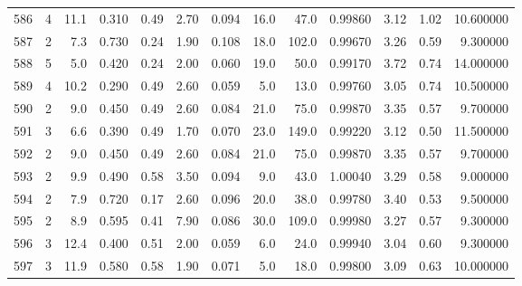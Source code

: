 \begin{tabular}{lrrrrrrrrrrrr}
586  &        4 &           11.1 &             0.310 &         0.49 &            2.70 &      0.094 &                 16.0 &                  47.0 &  0.99860 &  3.12 &       1.02 &  10.600000 \\
587  &        2 &            7.3 &             0.730 &         0.24 &            1.90 &      0.108 &                 18.0 &                 102.0 &  0.99670 &  3.26 &       0.59 &   9.300000 \\
588  &        5 &            5.0 &             0.420 &         0.24 &            2.00 &      0.060 &                 19.0 &                  50.0 &  0.99170 &  3.72 &       0.74 &  14.000000 \\
589  &        4 &           10.2 &             0.290 &         0.49 &            2.60 &      0.059 &                  5.0 &                  13.0 &  0.99760 &  3.05 &       0.74 &  10.500000 \\
590  &        2 &            9.0 &             0.450 &         0.49 &            2.60 &      0.084 &                 21.0 &                  75.0 &  0.99870 &  3.35 &       0.57 &   9.700000 \\
591  &        3 &            6.6 &             0.390 &         0.49 &            1.70 &      0.070 &                 23.0 &                 149.0 &  0.99220 &  3.12 &       0.50 &  11.500000 \\
592  &        2 &            9.0 &             0.450 &         0.49 &            2.60 &      0.084 &                 21.0 &                  75.0 &  0.99870 &  3.35 &       0.57 &   9.700000 \\
593  &        2 &            9.9 &             0.490 &         0.58 &            3.50 &      0.094 &                  9.0 &                  43.0 &  1.00040 &  3.29 &       0.58 &   9.000000 \\
594  &        2 &            7.9 &             0.720 &         0.17 &            2.60 &      0.096 &                 20.0 &                  38.0 &  0.99780 &  3.40 &       0.53 &   9.500000 \\
595  &        2 &            8.9 &             0.595 &         0.41 &            7.90 &      0.086 &                 30.0 &                 109.0 &  0.99980 &  3.27 &       0.57 &   9.300000 \\
596  &        3 &           12.4 &             0.400 &         0.51 &            2.00 &      0.059 &                  6.0 &                  24.0 &  0.99940 &  3.04 &       0.60 &   9.300000 \\
597  &        3 &           11.9 &             0.580 &         0.58 &            1.90 &      0.071 &                  5.0 &                  18.0 &  0.99800 &  3.09 &       0.63 &  10.000000 \\

\end{tabular}
